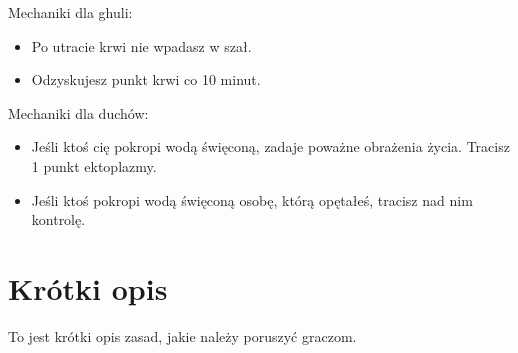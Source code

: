 	Mechaniki dla ghuli:
	\begin{itemize}
		\item Po utracie krwi nie wpadasz w szał.
		\item Odzyskujesz punkt krwi co 10 minut.
	\end{itemize}
	
	Mechaniki dla duchów:
	\begin{itemize}
		\item Jeśli ktoś cię pokropi wodą święconą, zadaje poważne obrażenia życia. Tracisz 1 punkt ektoplazmy.
		\item Jeśli ktoś pokropi wodą święconą osobę, którą opętałeś, tracisz nad nim kontrolę.
	\end{itemize}
		
\section{Krótki opis}
	To jest krótki opis zasad, jakie należy poruszyć graczom.
